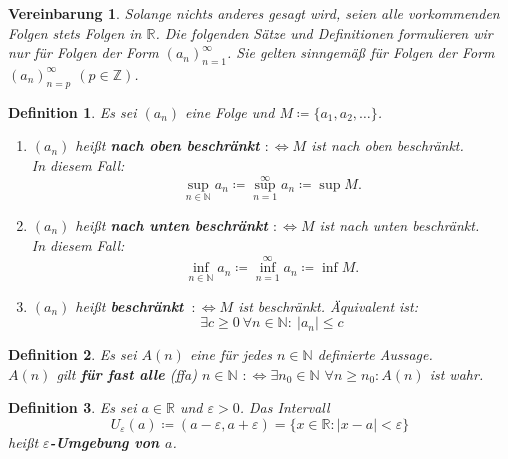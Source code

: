 \documentclass[12pt]{extreport} %
\newcommand{\N}{\mathbb{N}}
\newcommand{\R}{\mathbb{R}}
\newcommand{\Z}{\mathbb{Z}}
\theoremstyle{named}
\theoremstyle{itshape}
\newtheorem*{definition}{Definition}
\theoremstyle{normal}
\newtheorem*{vereinbarung}{Vereinbarung}
\begin{document}
\begin{vereinbarung}
	Solange nichts anderes gesagt wird, seien alle vorkommenden Folgen stets Folgen in $\R$. 	                                                                                               
	Die folgenden Sätze und Definitionen formulieren wir nur für Folgen der Form $(a_{n})_{n=1}^{\infty}$. Sie gelten sinngemä{\ss} für Folgen der Form 
	$(a_{n})_{n=p}^{\infty}$ $(p \in \Z)$.
\end{vereinbarung}

\begin{definition}
	Es sei $(a_{n})$ eine Folge und $M \coloneqq \{ a_{1}, a_{2}, \dotsc \}$.
	\begin{enumerate}
		\item$(a_{n})$ hei{\ss}t \textbf{nach oben beschränkt} $:\iff M$ ist nach oben beschränkt.\\ 
		In diesem Fall: $$\sup_{n \in \N} a_{n} \coloneqq \sup_{n = 1}^{\infty} a_{n} \coloneqq \sup M.$$
		\item$(a_{n})$ hei{\ss}t \textbf{nach unten beschränkt} $:\iff M$ ist nach unten beschränkt. \\ 
		In diesem Fall: $$\inf_{n \in \N} a_{n} \coloneqq \inf_{n = 1}^{\infty} a_{n} \coloneqq \inf M.$$
		\item$(a_{n})$ hei{\ss}t \textbf{beschränkt} $~:\iff M$ ist beschränkt. Äquivalent ist: 
			$$\exists c \geq 0 ~ \forall n \in \N: ~ |a_{n}| \leq c$$
	\end{enumerate}
\end{definition}

\begin{definition}
	Es sei $A(n)$ eine für jedes $n \in \N$ definierte Aussage. \\
	$A(n)$ gilt \textbf{für fast alle} (ffa) $n \in \N$ $:\iff \exists n_{0} \in \N$ $\forall n \geq n_{0}: A(n)$ ist wahr.
\end{definition}

\begin{definition}
	Es sei $a \in \R$ und $\varepsilon > 0$. Das Intervall
		$$ U_{\varepsilon}(a) \coloneqq (a - \varepsilon, a + \varepsilon) = \{ x \in \R : | x - a| < \varepsilon \} $$
	hei{\ss}t $\varepsilon$\textbf{-Umgebung von $a$}.
\end{definition}
\end{document}
